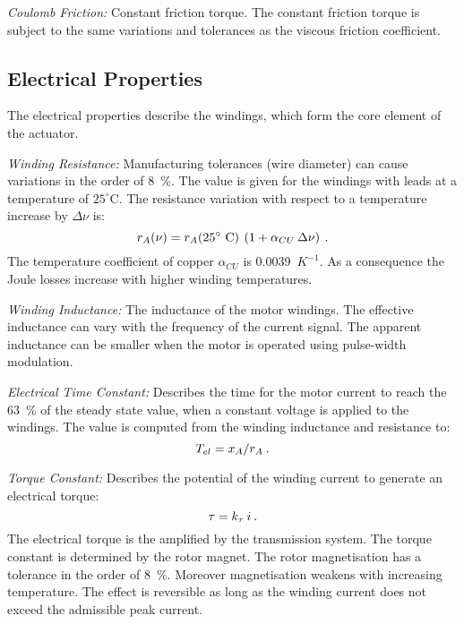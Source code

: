 \documentclass[a4paper,10pt]{cjtdsheet}      %
\begin{document}
\begin{multicols}{2}
\emph{Coulomb Friction:} Constant friction torque. The constant friction torque is subject to the same variations and tolerances as the viscous friction coefficient.

%
%
\subsection*{\textcolor{cjtred}{Electrical Properties}}
The electrical properties describe the windings, which form the core element of the actuator. 

\emph{Winding Resistance:} Manufacturing tolerances (wire diameter) can cause variations in the order of 8~\%. The value is given for the windings with leads at a temperature of $25^\circ$C. The resistance variation with respect to a temperature increase by $\Delta \nu$ is:
\begin{equation}
	r_A(\nu) = r_A(25^\circ\text{ C})\:\left(1+\alpha_{CU} 	\: \Delta \nu\right)	\:.
\end{equation}
The temperature coefficient of copper $\alpha_{CU}$ is 0.0039~$K^{-1}$. As a consequence the Joule losses increase with higher winding temperatures.
 
\emph{Winding Inductance:} The inductance of the motor windings. The effective inductance can vary with the frequency of the current signal. The apparent inductance can be smaller when the motor is operated using pulse-width modulation.

\emph{Electrical Time Constant:} Describes the time for the motor current to reach the 63~\% of the steady state value, when a constant voltage is applied to the windings. The value is computed from the winding inductance and resistance to:
\begin{equation}
T_{el} = x_A / r_A\:.
\end{equation}

\emph{Torque Constant:} Describes the potential of the winding current to generate an electrical torque:
\begin{equation}
	\tau = k_\tau \: i\:.
\end{equation}
The electrical torque is the amplified by the transmission system. The torque constant is determined by the rotor magnet. The rotor magnetisation has a tolerance in the order of 8~\%. Moreover magnetisation weakens with increasing temperature. The effect is reversible as long as the winding current does not exceed the admissible peak current.


\end{multicols}
\end{document}
